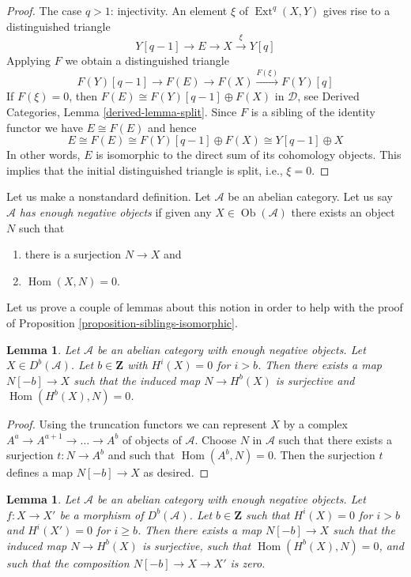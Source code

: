 \documentclass{stacks-project}
\theoremstyle{plain}
\newtheorem{lemma}[subsection]{Lemma}
\theoremstyle{definition}
\theoremstyle{remark}
\numberwithin{equation}{subsection}
\def\Hom{\mathop{\mathrm{Hom}}\nolimits}
\def\Ext{\mathop{\mathrm{Ext}}\nolimits}
\def\Ob{\mathop{\mathrm{Ob}}\nolimits}
\begin{document}
\begin{proof}
\medskip\noindent
The case $q > 1$: injectivity. An element $\xi$ of $\Ext^q(X, Y)$
gives rise to a distinguished triangle
$$
Y[q - 1] \to E \to X \xrightarrow{\xi} Y[q]
$$
Applying $F$ we obtain a distinguished triangle
$$
F(Y)[q - 1] \to F(E) \to F(X) \xrightarrow{F(\xi)} F(Y)[q]
$$
If $F(\xi) = 0$, then $F(E) \cong F(Y)[q - 1] \oplus F(X)$
in $\mathcal{D}$, see
Derived Categories, Lemma \ref{derived-lemma-split}.
Since $F$ is a sibling of the identity functor we have
$E \cong F(E)$ and hence
$$
E \cong F(E) \cong F(Y)[q - 1] \oplus F(X) \cong Y[q - 1] \oplus X
$$
In other words, $E$ is isomorphic to the
direct sum of its cohomology objects. This implies that the
initial distinguished triangle is split, i.e., $\xi = 0$.
\end{proof}

\noindent
Let us make a nonstandard definition. Let $\mathcal{A}$ be an abelian
category. Let us say $\mathcal{A}$ {\it has enough negative objects}
if given any $X \in \Ob(\mathcal{A})$ there exists an object $N$ such that
\begin{enumerate}
\item there is a surjection $N \to X$ and
\item $\Hom(X, N) = 0$.
\end{enumerate}
Let us prove a couple of lemmas about this notion in order to
help with the proof of Proposition \ref{proposition-siblings-isomorphic}.

\begin{lemma}
\label{lemma-good-map}
Let $\mathcal{A}$ be an abelian category with enough negative objects.
Let $X \in D^b(\mathcal{A})$. Let $b \in \mathbf{Z}$ with
$H^i(X) = 0$ for $i > b$. Then
there exists a map $N[-b] \to X$ such that the induced map
$N \to H^b(X)$ is surjective and $\Hom(H^b(X), N) = 0$.
\end{lemma}

\begin{proof}
Using the truncation functors we can represent $X$ by a complex
$A^a \to A^{a + 1} \to \ldots \to A^b$ of objects of $\mathcal{A}$.
Choose $N$ in $\mathcal{A}$ such that there exists a surjection
$t : N \to A^b$ and such that $\Hom(A^b, N) = 0$. Then the surjection $t$
defines a map $N[-b] \to X$ as desired.
\end{proof}

\begin{lemma}
\label{lemma-good-map-zero}
Let $\mathcal{A}$ be an abelian category with enough negative objects.
Let $f : X \to X'$ be a morphism of $D^b(\mathcal{A})$. Let $b \in \mathbf{Z}$
such that $H^i(X) = 0$ for $i > b$ and $H^i(X') = 0$ for $i \geq b$.
Then there exists a map $N[-b] \to X$ such that the induced map
$N \to H^b(X)$ is surjective, such that $\Hom(H^b(X), N) = 0$, and
such that the composition $N[-b] \to X \to X'$ is zero.
\end{lemma}
\end{document}
